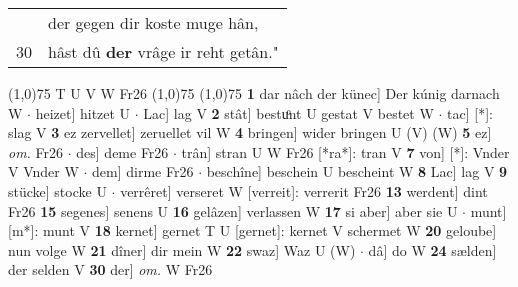 \documentclass[8pt,a4paper,notitlepage]{article}
\begin{document}
\begin{table}[ht]
\begin{minipage}[t]{0.5\linewidth}
\begin{tabular}{rl}
 & der gegen dir koste muge hân,\\ 
30 & hâst dû \textbf{der} vrâge ir reht getân."\\ 
\end{tabular}
\scriptsize
\line(1,0){75} \newline
T U V W Fr26 \newline
\line(1,0){75} \newline
\newline
\line(1,0){75} \newline
\textbf{1} dar nâch der künec] Der kúnig darnach W  $\cdot$ heizet] hitzet U  $\cdot$ Lac] lag V \textbf{2} stât] bestuͦnt U gestat V bestet W  $\cdot$ tac] [*]: slag V \textbf{3} ez zervellet] zeruellet vil W \textbf{4} bringen] wider bringen U (V) (W) \textbf{5} ez] \textit{om.} Fr26  $\cdot$ des] deme Fr26  $\cdot$ trân] stran U W Fr26 [*ra*]: tran V \textbf{7} von] [*]: Vnder V Vnder W  $\cdot$ dem] dirme Fr26  $\cdot$ beschîne] beschein U bescheint W \textbf{8} Lac] lag V \textbf{9} stücke] stocke U  $\cdot$ verrêret] verseret W [verreit]: verrerit Fr26 \textbf{13} werdent] dint Fr26 \textbf{15} segenes] senens U \textbf{16} gelâzen] verlassen W \textbf{17} si aber] aber sie U  $\cdot$ munt] [m*]: munt V \textbf{18} kernet] gernet T U [gernet]: kernet V schermet W \textbf{20} geloube] nun volge W \textbf{21} dîner] dir mein W \textbf{22} swaz] Waz U (W)  $\cdot$ dâ] do W \textbf{24} sælden] der selden V \textbf{30} der] \textit{om.} W Fr26 \newline
\end{minipage}
\end{table}
\end{document}
